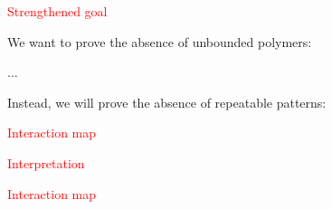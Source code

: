 \documentclass[landscape,20pt]{transparents2e}
\newcommand{\red}{\textcolor{red}}
\renewcommand{\frametitle}[1]{\red{\HUGE #1 }}
\begin{document}
\begin{slide}{\frametitle{Strengthened goal}}

  We want to prove the absence of unbounded polymers:\bigskip\\

  \begin{minipage}{\linewidth}
  \begin{minipage}{1cm}\vspace*{-2.4cm}$\ldots$\end{minipage}
  \end{minipage}

\vspace*{1cm}

Instead, we will prove the absence of repeatable patterns:\bigskip\\

\begin{minipage}{\linewidth}
\begin{center}
\end{center}
\end{minipage}

\end{slide}

\begin{slide}{\frametitle{Interaction map}}

  {\begin{minipage}{\linewidth}
  \begin{center}
  \end{center}
  \end{minipage}}

\end{slide}

\begin{slide}{\frametitle{Interpretation}}

  {\begin{minipage}{\linewidth}
  \begin{center}
  \end{center}
  \end{minipage}}

\end{slide}

\begin{slide}{\frametitle{Interaction map}}

  {\begin{minipage}{\linewidth}
  \begin{center}
  \end{center}
  \end{minipage}}

\end{slide}
\end{document}
